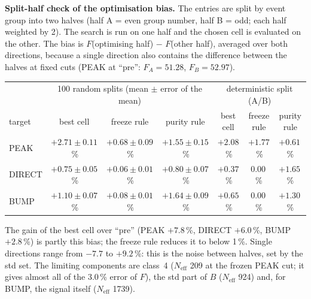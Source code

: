 \textbf{Split-half check of the optimisation bias.} The entries are split by event group into two
halves (half A = even group number, half B = odd; each half weighted by 2). The search is run on
one half and the chosen cell is evaluated on the other. The bias is $F$(optimising half) $-$
$F$(other half), averaged over both directions, because a single direction also contains the
difference between the halves at fixed cuts (PEAK at ``pre'': $F_A = 51.28$, $F_B = 52.97$).
\begin{center}
\small
\begin{tabular}{@{}l ccc ccc@{}}
\toprule
 & \multicolumn{3}{c}{100 random splits (mean $\pm$ error of the mean)} & \multicolumn{3}{c}{deterministic split (A/B)} \\
target & best cell & freeze rule & purity rule & best cell & freeze rule & purity rule \\
\midrule
PEAK   & $+2.71\pm0.11$\,\% & $+0.68\pm0.09$\,\% & $+1.55\pm0.15$\,\% & $+2.08$\,\% & $+1.77$\,\% & $+0.61$\,\% \\
DIRECT & $+0.75\pm0.05$\,\% & $+0.06\pm0.01$\,\% & $+0.80\pm0.07$\,\% & $+0.37$\,\% & 0.00\,\% & $+1.65$\,\% \\
BUMP   & $+1.10\pm0.07$\,\% & $+0.08\pm0.01$\,\% & $+1.64\pm0.09$\,\% & $+0.65$\,\% & 0.00\,\% & $+1.30$\,\% \\
\bottomrule
\end{tabular}
\end{center}
The gain of the best cell over ``pre'' (PEAK $+7.8$\,\%, DIRECT $+6.0$\,\%, BUMP $+2.8$\,\%) is partly
this bias; the freeze rule reduces it to below 1\,\%. Single directions range from $-7.7$ to
$+9.2$\,\%: this is the noise between halves, set by the std set. The limiting components are
class~4 ($N_{\mathrm{eff}}$ 209 at the frozen PEAK cut; it gives almost all of the 3.0\,\% error of $F$),
the std part of $B$ ($N_{\mathrm{eff}}$ 924) and, for BUMP, the signal itself ($N_{\mathrm{eff}}$ 1739).


